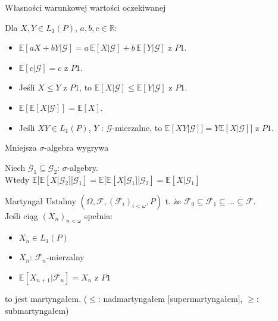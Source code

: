 \documentclass[avery5371, grid, frame]{flashcards}
\begin{document}
\begin{flashcard}[Twierdzenie]{Własności warunkowej wartości oczekiwanej}

Dla $X, Y \in L_1(P)$, $a, b, c \in \mathbb{R}$:
\begin{itemize}
\item $\mathbb{E}[aX +bY | \mathcal{G}] = a \, \mathbb{E}[ X | \mathcal{G} ] +
                                          b \, \mathbb{E}[ Y | \mathcal{G} ]$ z $P1$.
\item $\mathbb{E}[c | \mathcal{G} ] = c $ z $P1$.
\item Jeśli $X \leq Y $ z $P1$, to $ \mathbb{E}[X | \mathcal{G}] \leq \mathbb{E}[Y | \mathcal{G}]$ z $P1$.
\item $\mathbb{E} [ \mathbb{E} [ X | \mathcal{G} ] ] = \mathbb{E}[X]$.
\item Jeśli $XY \in L_1(P)$, $Y$ : $\mathcal{G}$-mierzalne, to $\mathbb{E}[XY|\mathcal{G}]] =
                                                                Y\mathbb{E}[X|\mathcal{G}]]$ z $P1$.
\end{itemize}
\end{flashcard}

\begin{flashcard}[Twierdzenie]{Mniejsza $\sigma$-algebra wygrywa}

\smallskip
Niech $\mathcal{G}_1 \subseteq \mathcal{G}_2$: $\sigma$-algebry. \\
Wtedy $\mathbb{E} [ \mathbb{E} [ X | \mathcal{G}_2] | \mathcal{G}_1 ] =
       \mathbb{E} [ \mathbb{E} [ X | \mathcal{G}_1] | \mathcal{G}_2 ] =
       \mathbb{E} [ X | \mathcal{G}_1]$
\end{flashcard}


\begin{flashcard}[Definicja]{Martyngał}
\smallskip
Ustalmy $ \left( \Omega, \mathcal{F}, \left( \mathcal{F}_i \right) _{i < \omega}, P \right) $ t. że $\mathcal{F}_0 \subseteq \mathcal{F}_1 \subseteq ... \subseteq \mathcal{F}$. \\
Jeśli ciąg $\left( X_n \right) _{n < \omega} $ spełnia:
\begin{itemize}
\item $ X_n \in L_1(P) $
\item $ X_n $: $ \mathcal{F}_n $-mierzalny
\item $ \mathbb{E} [ X_{n+1} | \mathcal{F}_n ] = X_n $ z $P1$
\end{itemize}
to jest martyngałem. ($ \leq $: nadmartyngałem [supermartyngałem], $ \geq $: submartyngałem)
\end{flashcard}
\end{document}
